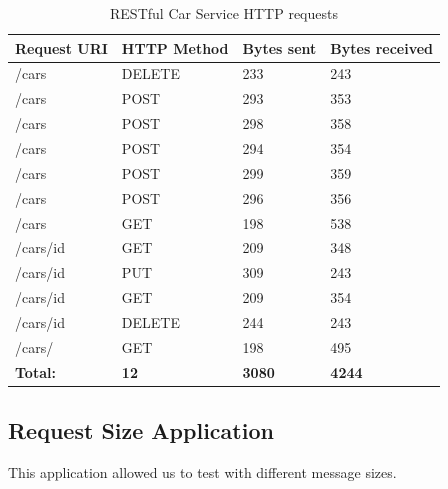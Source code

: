 \begin{table}[h]
\begin{tabular}{|l|l|l|l|}
\hline
\textbf{Request URI} & \textbf{HTTP Method} & \textbf{Bytes sent} & \textbf{Bytes received} \\ \hline
/cars                   & DELETE                  & 233                 & 243           \\ \hline
/cars                   & POST                  & 293                 & 353           \\ \hline
/cars                    & POST                 & 298                 & 358           \\ \hline
/cars                    & POST                 & 294                 & 354           \\ \hline
/cars                    & POST                 & 299                 & 359           \\ \hline
/cars                    & POST                 & 296                 & 356           \\ \hline
/cars                    & GET                 & 198                 & 538           \\ \hline
/cars/{id}                    & GET                 & 209                 & 348           \\ \hline
/cars/{id}                    & PUT                 & 309                 & 243           \\ \hline
/cars/{id}                   & GET                 & 209                 & 354           \\ \hline
/cars/{id}                   & DELETE                 & 244                 & 243           \\ \hline
/cars/                   & GET                 & 198                 & 495           \\ \hline
\textbf{Total:}       & \textbf{12}               & \textbf{3080}                & \textbf{4244}          \\ \hline
\end{tabular}
\caption{RESTful Car Service HTTP requests}
\end{table}


\subsection{Request Size Application}

This application allowed us to test with different message sizes.



